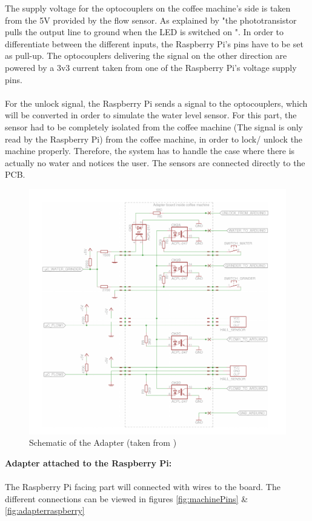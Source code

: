 \documentclass[12pt]{article}
\begin{document}
  The supply voltage for the optocouplers on the coffee machine's side is taken from the 5V provided by the flow sensor. 
  As explained by \cite{BachelorThesis} "the phototransistor pulls the output line to ground when the LED is switched on ".
  In order to differentiate between the different inputs, the Raspberry Pi's pins have to be set as pull-up.
  The optocouplers delivering the signal on the other direction are powered by a 3v3 current taken from one of the Raspberry Pi's voltage supply pins.\\~\\
  For the unlock signal, the Raspberry Pi sends a signal to the optocouplers, which will be converted in order to simulate the water level sensor.
  For this part, the sensor had to be completely isolated from the coffee machine (The signal is only read by the Raspberry Pi) from the coffee machine, in order to lock/ unlock the machine properly. 
  Therefore, the system has to handle the case where there is actually no water and notices the user.
  The sensors are connected directly to the PCB.
  \begin{figure}[H]
   \centering
   \includegraphics[width=17cm]{./images/oldPCBSchematic.pdf}
   \captionsetup{justification=centering}
   \caption{Schematic of the Adapter (taken from \cite{BachelorThesis})}
   \label{fig:pcb}
  \end{figure}
  \newpage
  \textbf{Adapter attached to the Raspberry Pi:}\\~\\
  The Raspberry Pi facing part will connected with wires to the board. The different connections can be viewed in figures \ref{fig:machinePins} \& \ref{fig:adapterraspberry} 
  
\end{document}
